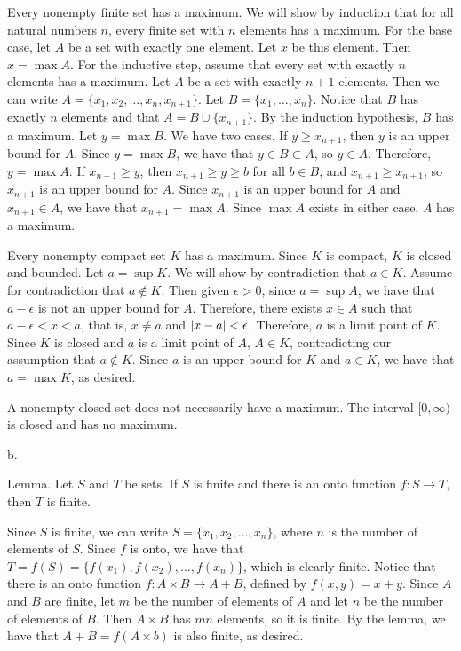Every nonempty finite set has a maximum.
We will show by induction that for all natural numbers $n$,
every finite set with $n$ elements has a maximum.
For the base case, let $A$ be a set with exactly one element.
Let $x$ be this element.
Then $x = \max A$.
For the inductive step, assume that
every set with exactly $n$ elements has a maximum.
Let $A$ be a set with exactly $n + 1$ elements.
Then we can write $A = \{x_1, x_2, \ldots, x_n, x_{n+1}\}$.
Let $B = \{x_1, \ldots, x_n\}$.
Notice that $B$ has exactly $n$ elements and that $A = B \cup \{x_{n+1}\}$.
By the induction hypothesis, $B$ has a maximum.
Let $y = \max B$.
We have two cases.
If $y \ge x_{n+1}$, then $y$ is an upper bound for $A$.
Since $y = \max B$, we have that $y \in B \subset A$, so $y \in A$.
Therefore, $y = \max A$.
If $x_{n+1} \ge y$, then $x_{n+1} \ge y \ge b$ for all $b \in B$,
and $x_{n+1} \ge x_{n+1}$,
so $x_{n+1}$ is an upper bound for $A$.
Since $x_{n+1}$ is an upper bound for $A$ and $x_{n+1} \in A$,
we have that $x_{n+1} = \max A$.
Since $\max A$ exists in either case, $A$ has a maximum.

Every nonempty compact set $K$ has a maximum.
Since $K$ is compact, $K$ is closed and bounded.
Let $a = \sup K$.
We will show by contradiction that $a \in K$.
Assume for contradiction that $a \notin K$.
Then given $\epsilon > 0$, since $a = \sup A$,
we have that $a - \epsilon$ is not an upper bound for $A$.
Therefore, there exists $x \in A$ such that $a - \epsilon < x < a$,
that is, $x \ne a$ and $\vert x - a\vert < \epsilon$.
Therefore, $a$ is a limit point of $K$.
Since $K$ is closed and $a$ is a limit point of $A$,
$A \in K$, contradicting our assumption that $a \notin K$.
Since $a$ is an upper bound for $K$ and $a \in K$,
we have that $a = \max K$, as desired.

A nonempty closed set does not necessarily have a maximum.
The interval $[0,\infty)$ is closed and has no maximum.
\medskip
\item{} b.

\proclaim Lemma. Let $S$ and $T$ be sets.
If $S$ is finite and there is an onto function
$f: S \to T$, then $T$ is finite.

Since $S$ is finite, we can write
$S = \{x_1, x_2, \ldots, x_n\}$, where $n$ is the number of elements of $S$.
Since $f$ is onto, we have that $T = f(S) =
\{f(x_1), f(x_2), \ldots, f(x_n)\}$, which is clearly finite.
\smallskip
Notice that there is an onto function $f: A \times B \to A+B$,
defined by $f(x,y) = x + y$.
Since $A$ and $B$ are finite,
let $m$ be the number of elements of $A$ and
let $n$ be the number of elements of $B$.
Then $A \times B$ has $mn$ elements, so it is finite.
By the lemma, we have that $A + B = f(A \times b)$
is also finite, as desired.

